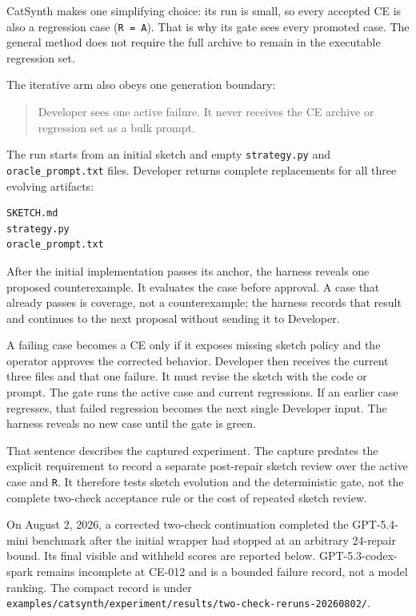 CatSynth makes one simplifying choice: its run is small, so every accepted CE is also a
regression case (\texttt{R\ =\ A}). That is why its gate sees every promoted case. The general method does
not require the full archive to remain in the executable regression set.

The iterative arm also obeys one generation boundary:

\begin{quote}
Developer sees one active failure. It never receives the CE archive or regression set as a
bulk prompt.
\end{quote}

The run starts from an initial sketch and empty \texttt{strategy.py} and \texttt{oracle\_prompt.txt} files.
Developer returns complete replacements for all three evolving artifacts:

\begin{verbatim}
SKETCH.md
strategy.py
oracle_prompt.txt
\end{verbatim}

After the initial implementation passes its anchor, the harness reveals one proposed
counterexample. It evaluates the case before approval. A case that already passes is coverage,
not a counterexample; the harness records that result and continues to the next proposal without
sending it to Developer.

A failing case becomes a CE only if it exposes missing sketch policy and the operator approves
the corrected behavior. Developer then receives the current three files and that one failure. It
must revise the sketch with the code or prompt. The gate runs the active case and current
regressions. If an earlier case regresses, that failed regression becomes the next single
Developer input. The harness reveals no new case until the gate is green.

That sentence describes the captured experiment. The capture predates the explicit requirement
to record a separate post-repair sketch review over the active case and \texttt{R}. It therefore tests
sketch evolution and the deterministic gate, not the complete two-check acceptance rule or the
cost of repeated sketch review.

On August 2, 2026, a corrected two-check continuation completed the GPT-5.4-mini benchmark after
the initial wrapper had stopped at an arbitrary 24-repair bound. Its final visible and withheld
scores are reported below. GPT-5.3-codex-spark remains incomplete at CE-012 and is a bounded
failure record, not a model ranking. The compact record is under
\texttt{examples/catsynth/experiment/results/two-check-reruns-20260802/}.

